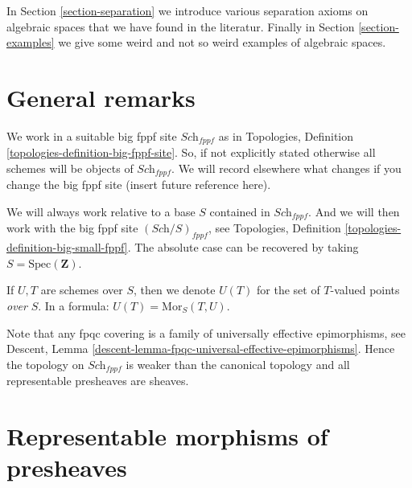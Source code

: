 \medskip\noindent
In Section \ref{section-separation} we introduce various separation
axioms on algebraic spaces that we have found in the literatur.
Finally in Section \ref{section-examples}
we give some weird and not so weird examples of algebraic spaces.






\section{General remarks}
\label{section-general}

\noindent
We work in a suitable big fppf site $\textit{Sch}_{fppf}$
as in Topologies, Definition \ref{topologies-definition-big-fppf-site}.
So, if not explicitly stated otherwise all schemes will be objects
of $\textit{Sch}_{fppf}$.
We will record elsewhere what changes if you change the big
fppf site (insert future reference here).

\medskip\noindent
We will always work relative to a base $S$ contained in $\textit{Sch}_{fppf}$.
And we will then work with the big fppf site $(\textit{Sch}/S)_{fppf}$,
see Topologies, Definition \ref{topologies-definition-big-small-fppf}.
The absolute case can be recovered by taking
$S = \text{Spec}(\mathbf{Z})$.

\medskip\noindent
If $U, T$ are schemes over $S$, then we denote
$U(T)$ for the set of $T$-valued points {\it over} $S$.
In a formula: $U(T) = \text{Mor}_S(T, U)$.

\medskip\noindent
Note that any fpqc covering is a family of universally effective
epimorphisms, see
Descent, Lemma \ref{descent-lemma-fpqc-universal-effective-epimorphisms}.
Hence the topology on $\textit{Sch}_{fppf}$
is weaker than the canonical topology and all representable presheaves
are sheaves.







\section{Representable morphisms of presheaves}
\label{section-representable}

